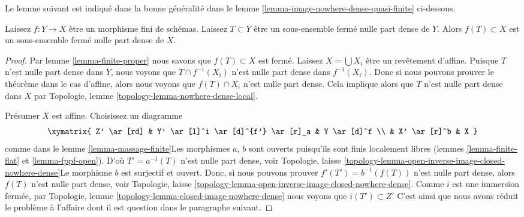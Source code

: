 \noindent
Le lemme suivant est indiqué dans la bonne généralité dans le lemme \ref{lemma-image-nowhere-dense-quasi-finite} ci-dessous.

\begin{lemma}

\label{lemma-image-nowhere-dense-finite}
Laissez $f : Y \to X$ être un morphisme fini de schémas. Laissez $T \subset Y$ être un sous-ensemble fermé nulle part dense de $Y$. Alors $f(T) \subset X$ est un sous-ensemble fermé nulle part dense de $X$.
\end{lemma}

\begin{proof}
Par lemme \ref{lemma-finite-proper} nous savons que $f(T) \subset X$ est fermé. Laissez $X = \bigcup X_i$ être un revêtement d'affine. Puisque $T$ n'est nulle part dense dans $Y$, nous voyons que $T \cap f^{-1}(X_i)$ n'est nulle part dense dans $f^{-1}(X_i)$. Donc si nous pouvons prouver le théorème dans le cas d'affine, alors nous voyons que $f(T) \cap X_i$ n'est nulle part dense. Cela implique alors que $T$ n'est nulle part dense dans $X$ par Topologie, lemme \ref{topology-lemma-nowhere-dense-local}.

\medskip\noindent

Présumer $X$ est affine. Choisissez un diagramme
$$
\xymatrix{
Z' \ar[rd] &
Y' \ar[l]^i \ar[d]^{f'} \ar[r]_a &
Y \ar[d]^f \\
 & X' \ar[r]^b & X
}
$$
comme dans le lemme \ref{lemma-massage-finite}Les morphismes $a$, $b$ sont ouverts puisqu'ils sont finis localement libres (lemmes \ref{lemma-finite-flat} et \ref{lemma-fppf-open}). D'où $T' = a^{-1}(T)$ n'est nulle part dense, voir Topologie, laisse \ref{topology-lemma-open-inverse-image-closed-nowhere-dense}Le morphisme $b$ est surjectif et ouvert. Donc, si nous pouvons prouver $f'(T') = b^{-1}(f(T))$ n'est nulle part dense, alors $f(T)$ n'est nulle part dense, voir Topologie, laisse \ref{topology-lemma-open-inverse-image-closed-nowhere-dense}. Comme $i$ est une immersion fermée, par Topologie, lemme \ref{topology-lemma-closed-image-nowhere-dense}
nous voyons que $i(T') \subset Z'$ C'est ainsi que nous avons réduit le problème à l'affaire dont il est question dans le paragraphe suivant.

\medskip\noindent


\end{proof}
